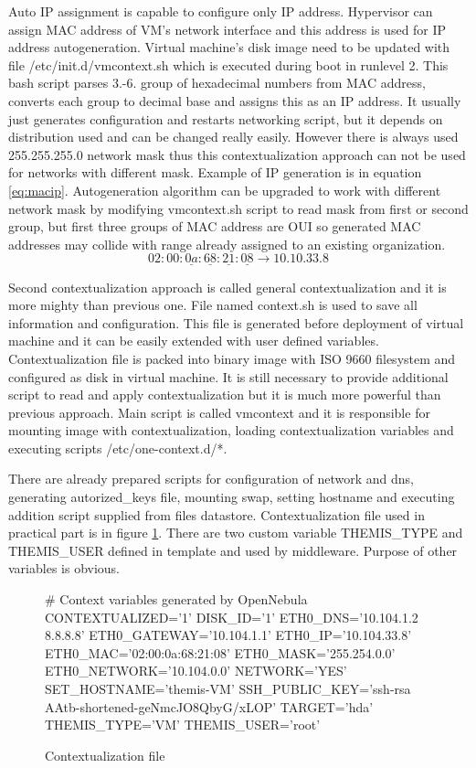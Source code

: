 Auto \Ac{IP} assignment is capable to configure only \Ac{IP} address. Hypervisor can assign \Ac{MAC} address of \Ac{VM}'s network interface and this address is used for \Ac{IP} address autogeneration. Virtual machine's disk image need to be updated with file /etc/init.d/vmcontext.sh which is executed during boot in runlevel 2. This \Ac{bash} script parses 3.-6. group of hexadecimal numbers from \Ac{MAC} address, converts each group to decimal base and assigns this as an \Ac{IP} address. It usually just generates configuration and restarts networking script, but it depends on distribution used and can be changed really easily.
However there is always used 255.255.255.0 network mask thus this contextualization approach can not be used for networks with different mask. Example of \Ac{IP} generation is in equation \ref{eq:macip}. Autogeneration algorithm can be upgraded to work with different network mask by modifying vmcontext.sh script to read mask from first or second group, but first three groups of \Ac{MAC} address are \Ac{OUI} so generated \Ac{MAC} addresses may collide with range already assigned to an existing organization.
\begin{equation}
	\label{eq:macip}
	02:00:\underline{0a}:\underline{68}:\underline{21}:\underline{08} \rightarrow 10.10.33.8
\end{equation}

Second contextualization approach is called general contextualization and it is more mighty than previous one. File named context.sh is used to save all information and configuration. This file is generated before deployment of virtual machine and it can be easily extended with user defined variables.
Contextualization file is packed into binary image with ISO 9660 filesystem and configured as disk in virtual machine.
It is still necessary to provide additional script to read and apply contextualization but it is much more powerful than previous approach. Main script is called vmcontext and it is responsible for mounting image with contextualization, loading contextualization variables and executing scripts /etc/one-context.d/*. 

There are already prepared scripts for configuration of network and dns, generating autorized\_keys file, mounting swap, setting hostname and executing addition script supplied from files datastore. Contextualization file used in practical part is in figure \ref{code:contextualization}. There are two custom variable THEMIS\_TYPE and THEMIS\_USER defined in template and used by middleware. Purpose of other variables is obvious.

\begin{figure}[htb]
\caption{Contextualization file}
\label{code:contextualization}
\begin{verbatimtab}
# Context variables generated by OpenNebula
CONTEXTUALIZED='1'
DISK_ID='1'
ETH0_DNS='10.104.1.2 8.8.8.8'
ETH0_GATEWAY='10.104.1.1'
ETH0_IP='10.104.33.8'
ETH0_MAC='02:00:0a:68:21:08'
ETH0_MASK='255.254.0.0'
ETH0_NETWORK='10.104.0.0'
NETWORK='YES'
SET_HOSTNAME='themis-VM'
SSH_PUBLIC_KEY='ssh-rsa AAtb-shortened-geNmcJO8QbyG/xLOP'
TARGET='hda'
THEMIS_TYPE='VM'
THEMIS_USER='root'
\end{verbatimtab}
\end{figure}
